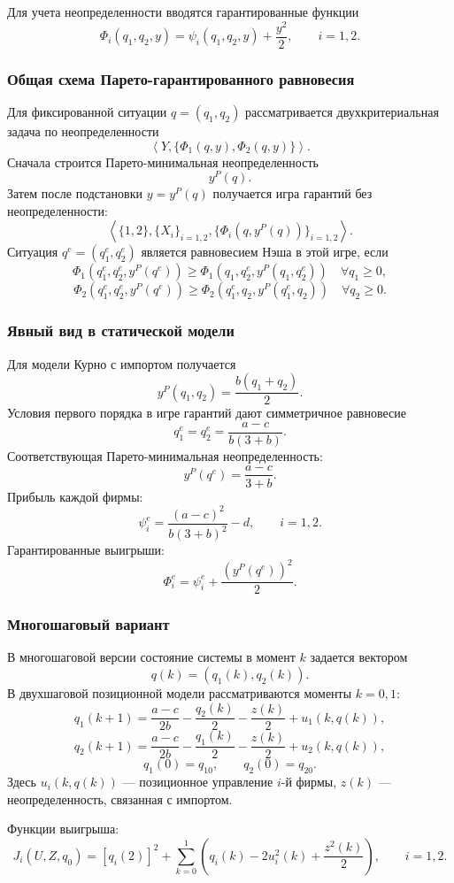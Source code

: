 \documentclass[12pt,a4paper]{article}
\begin{document}
Для учета неопределенности вводятся гарантированные функции
\[
\Phi_i(q_1,q_2,y)=\psi_i(q_1,q_2,y)+\frac{y^2}{2},
\qquad i=1,2.
\]

\subsubsection{Общая схема Парето-гарантированного равновесия}
Для фиксированной ситуации $q=(q_1,q_2)$ рассматривается двухкритериальная задача по неопределенности
\[
\left\langle Y,\{\Phi_1(q,y),\Phi_2(q,y)\}\right\rangle.
\]
Сначала строится Парето-минимальная неопределенность
\[
y^P(q).
\]
Затем после подстановки $y=y^P(q)$ получается игра гарантий без неопределенности:
\[
\left\langle \{1,2\},\{X_i\}_{i=1,2},\{\Phi_i(q,y^P(q))\}_{i=1,2}\right\rangle.
\]
Ситуация $q^e=(q_1^e,q_2^e)$ является равновесием Нэша в этой игре, если
\[
\Phi_1(q_1^e,q_2^e,y^P(q^e))\ge
\Phi_1(q_1,q_2^e,y^P(q_1,q_2^e))\quad \forall q_1\ge 0,
\]
\[
\Phi_2(q_1^e,q_2^e,y^P(q^e))\ge
\Phi_2(q_1^e,q_2,y^P(q_1^e,q_2))\quad \forall q_2\ge 0.
\]

\subsubsection{Явный вид в статической модели}
Для модели Курно с импортом получается
\[
y^P(q_1,q_2)=\frac{b(q_1+q_2)}{2}.
\]
Условия первого порядка в игре гарантий дают симметричное равновесие
\[
q_1^e=q_2^e=\frac{a-c}{b(3+b)}.
\]
Соответствующая Парето-минимальная неопределенность:
\[
y^P(q^e)=\frac{a-c}{3+b}.
\]
Прибыль каждой фирмы:
\[
\psi_i^e=\frac{(a-c)^2}{b(3+b)^2}-d,
\qquad i=1,2.
\]
Гарантированные выигрыши:
\[
\Phi_i^e=\psi_i^e+\frac{(y^P(q^e))^2}{2}.
\]

\subsubsection{Многошаговый вариант}
В многошаговой версии состояние системы в момент $k$ задается вектором
\[
q(k)=(q_1(k),q_2(k)).
\]
В двухшаговой позиционной модели рассматриваются моменты $k=0,1$:
\[
q_1(k+1)=\frac{a-c}{2b}-\frac{q_2(k)}{2}-\frac{z(k)}{2}+u_1(k,q(k)),
\]
\[
q_2(k+1)=\frac{a-c}{2b}-\frac{q_1(k)}{2}-\frac{z(k)}{2}+u_2(k,q(k)),
\]
\[
q_1(0)=q_{10},\qquad q_2(0)=q_{20}.
\]
Здесь $u_i(k,q(k))$ --- позиционное управление $i$-й фирмы, $z(k)$ --- неопределенность, связанная с импортом.

Функции выигрыша:
\[
J_i(U,Z,q_0)=[q_i(2)]^2+\sum_{k=0}^{1}\left(q_i(k)-2u_i^2(k)+\frac{z^2(k)}{2}\right),
\qquad i=1,2.
\]
\end{document}
